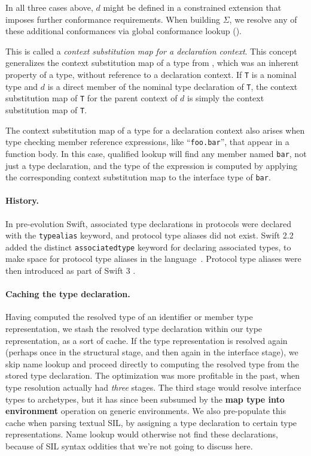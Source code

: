 \documentclass[../generics]{subfiles}
\begin{document}
In all three cases above, $d$ might be defined in a constrained extension that imposes further conformance requirements. When building $\Sigma$, we resolve any of these additional conformances via global conformance lookup ().

This is called a  \emph{context substitution map for a declaration context}. This concept generalizes the context substitution map of a type from , which was an inherent property of a type, without reference to a declaration context. If \texttt{T} is a nominal type and $d$ is a direct member of the nominal type declaration of \texttt{T}, the context substitution map of \texttt{T} for the parent context of $d$ is simply the context substitution map of \texttt{T}.

The context substitution map of a type for a declaration context also arises when type checking member reference expressions, like ``\texttt{foo.bar}'', that appear in a function body. In this case, qualified lookup will find any member named \texttt{bar}, not just a type declaration, and the type of the expression is computed by applying the corresponding context substitution map to the interface type of \texttt{bar}.

\paragraph{History.} In pre-evolution Swift, associated type declarations in protocols were declared with the \texttt{typealias} keyword, and protocol type aliases did not exist. Swift 2.2 added the distinct \texttt{associatedtype} keyword for declaring associated types, to make space for protocol type aliases in the language~\cite{se0011}. Protocol type aliases were then introduced as part of Swift 3 \cite{se0092}.

\paragraph{Caching the type declaration.} Having computed the resolved type of an identifier or member type representation, we stash the resolved type declaration within our type representation, as a sort of cache. If the type representation is resolved again (perhaps once in the structural stage, and then again in the interface stage), we skip name lookup and proceed directly to computing the resolved type from the stored type declaration. The optimization was more profitable in the past, when type resolution actually had \emph{three} stages. The third stage would resolve interface types to archetypes, but it has since been subsumed by the \textbf{map type into environment} operation on generic environments. We also pre-populate this cache when parsing textual SIL, by assigning a type declaration to certain type representations. Name lookup would otherwise not find these declarations, because of SIL syntax oddities that we're not going to discuss here.
\end{document}
